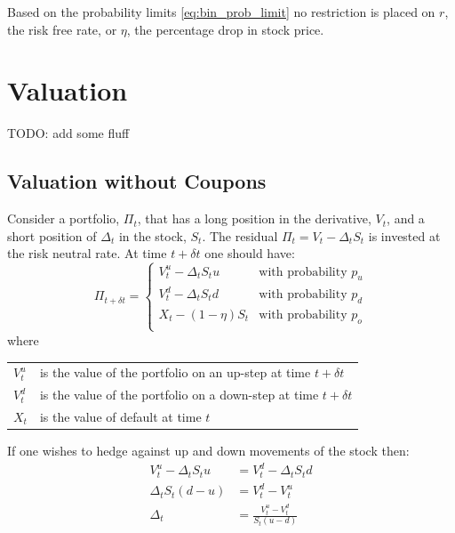 \documentclass[a4paper,11pt,oneside]{report}
\theoremstyle{plain}
\theoremstyle{definition}
\def\n{\nonumber\\}
\def\S{\ensuremath{S_t}\xspace}
\def\Dt{\ensuremath{\delta t}\xspace}
\def\u{\ensuremath{u}\xspace}
\def\d{\ensuremath{d}\xspace}
\def\o{\ensuremath{o}\xspace}
\def\pu{\ensuremath{p_\u}\xspace}
\def\pd{\ensuremath{p_\d}\xspace}
\def\po{\ensuremath{p_\o}\xspace}
\def\V{\ensuremath{V_t}\xspace}
\def\Vu{\ensuremath{V^{u}_t}\xspace}
\def\Vd{\ensuremath{V^{d}_t}\xspace}
\def\X{\ensuremath{X_t}\xspace}
\def\P{\ensuremath{\Pi_t}\xspace}
\def\D{\ensuremath{\Delta_t}\xspace}
\begin{document}
Based on the probability limits \eqref{eq:bin_prob_limit} no restriction is placed on $r$, the risk free rate, or $\eta$, the percentage drop in stock price.


\section{Valuation}
TODO: add some fluff

\subsection{Valuation without Coupons}
Consider a portfolio, \P, that has a long position in the derivative, \V, and a short position of \D in the stock, \S.  The residual $\P = \V - \D\S$ is invested at the risk neutral rate.  At time $t + \Dt$ one should have:
\begin{equation*}
 \Pi_{t + \Dt} =
 \begin{cases}
  \Vu - \D\S u          & \text{with probability } \pu \\
  \Vd - \D\S d          & \text{with probability } \pd\\
  \X - (1 - \eta)\S     & \text{with probability } \po\\
 \end{cases}
\end{equation*}
where

\begin{tabular}{ll}
 $\Vu$          & is the value of the portfolio on an up-step at time $t + \Dt$ \\
 $\Vd$          & is the value of the portfolio on a down-step at time $t + \Dt$ \\
 $\X$           & is the value of default at time $t$ \\
\end{tabular}

If one wishes to hedge against up and down movements of the stock then:
\begin{align}
    \Vu - \D\S u &= \Vd - \D\S d \n
     \D\S(d - u) &= \Vd - \Vu \n
              \D &= \frac{\Vu - \Vd}{\S(u - d)}
\end{align}
\end{document}
